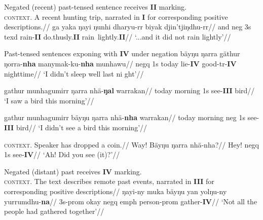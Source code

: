 \a\begingl\glpreamble Negated (recent) past-tensed sentence receives \textbf{II} marking.\\
\textsc{context.} A recent hunting trip, narrated in \textbf{I} for corresponding positive descriptions.//
\gla ga yaka ŋayi ŋunhi dharyu-rr biyak djin'tjiŋdhu-rr//
\glb and \gls{neg} 3s \gls{texd} rain-\textbf{II} do.thusly.\textbf{II} rain~lightly.\textbf{II}//
\glft`...and it did not rain lightly'//
\endgl

\xe


\pex Past-tensed sentences exponing with \textbf{IV} under negation
\a{}\begingl\gla bäyŋu ŋarra gäthur ŋorra-\textbf{nha} manymak-ku-\textbf{nha} munhawu//
\glb \gls{negq} 1s today lie-\textbf{IV} good-\gls{tr}-\textbf{IV} nighttime//
\glft`I didn't sleep well last ni	ght'//\endgl



\a\begingl\gla gathur munhagumirr ŋarra nhä-\textbf{ŋal} warrakan//
\glb today morning 1s see-\textbf{III} bird//
\glft`I saw a bird this morning'\trailingcitation{[FW 20180802]}//\endgl


\a\begingl\gla gathur munhagumirr bäyŋu ŋarra nhä-\textbf{nha} warrakan//
\glb today morning \gls{neg} 1s see-\textbf{III} bird//
\glft`I didn't see a bird this morning'\trailingcitation{[FW 20180802]}//\endgl

\a\begingl\glpreamble \textsc{context.} Speaker has dropped a coin.//
\gla Way! Bäyŋu ŋarra nhä-nha?//
\glb Hey! \gls{negq} 1s see-\textbf{IV}//
\glft`Ah! Did you see (it)?'\trailingcitation{[AW 20180830]}//\endgl

\a\begingl\glpreamble Negated (distant) past receives \textbf{IV} marking.\\
\textsc{context.} The text describes remote past events, narrated in \textbf{III} for corresponding positive descriptions//
\gla ŋayi-ny muka bäyŋu yan yolŋu-ny yurrumdhu-\textbf{na}//
\glb 3s-\gls{prom} okay \gls{negq} \gls{emph}  person-\gls{prom} gather-\textbf{IV}//
\glft`Not all the people had gathered together'//\endgl


